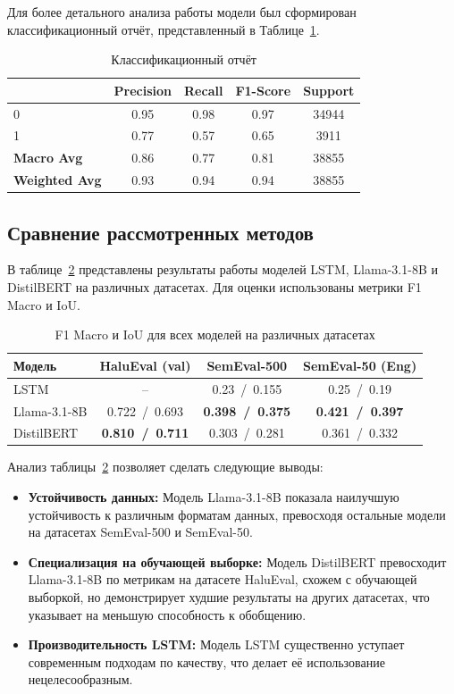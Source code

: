\documentclass[12pt]{article}
\begin{document}
Для более детального анализа работы модели был сформирован классификационный отчёт, представленный в Таблице~\ref{tab:classification_report}.
\begin{table}[ht]
\centering
\begin{tabular}{lcccc}
\toprule
 & \textbf{Precision} & \textbf{Recall} & \textbf{F1-Score} & \textbf{Support} \\
\midrule
0 & 0.95 & 0.98 & 0.97 & 34944 \\
1 & 0.77 & 0.57 & 0.65 & 3911 \\
\midrule
\textbf{Macro Avg} & 0.86 & 0.77 & 0.81 & 38855 \\
\textbf{Weighted Avg} & 0.93 & 0.94 & 0.94 & 38855 \\
\bottomrule
\end{tabular}
\caption{Классификационный отчёт}
\label{tab:classification_report}
\end{table}

\subsection{Сравнение рассмотренных методов}

В таблице~\ref{tab:comparison} представлены результаты работы моделей LSTM, Llama-3.1-8B и DistilBERT на различных датасетах. Для оценки использованы метрики F1 Macro и IoU.

\begin{table}[ht]
    \centering
    \begin{tabular}{lccc}
        \toprule
        \textbf{Модель} & \textbf{HaluEval} (val) & \textbf{SemEval-500} & \textbf{SemEval-50} (Eng) \\
        \midrule
        LSTM & -- & 0.23~/~0.155 & 0.25~/~0.19 \\
        Llama-3.1-8B & 0.722~/~0.693 & \textbf{0.398~/~0.375} & \textbf{0.421~/~0.397} \\
        DistilBERT & \textbf{0.810~/~0.711} & 0.303~/~0.281 & 0.361~/~0.332 \\
        \bottomrule
    \end{tabular}
    \caption{F1 Macro и IoU для всех моделей на различных датасетах}
    \label{tab:comparison}
\end{table}

Анализ таблицы~\ref{tab:comparison} позволяет сделать следующие выводы:
\begin{itemize}
    \item \textbf{Устойчивость данных:} Модель Llama-3.1-8B показала наилучшую устойчивость к различным форматам данных, превосходя остальные модели на датасетах SemEval-500 и SemEval-50.
    \item \textbf{Специализация на обучающей выборке:} Модель DistilBERT превосходит Llama-3.1-8B по метрикам на датасете HaluEval, схожем с обучающей выборкой, но демонстрирует худшие результаты на других датасетах, что указывает на меньшую способность к обобщению.
    \item \textbf{Производительность LSTM:} Модель LSTM существенно уступает современным подходам по качеству, что делает её использование нецелесообразным.
\end{itemize}
\end{document}
